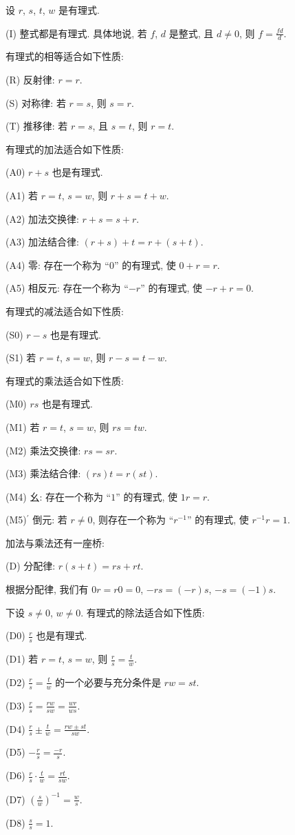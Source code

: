 \begin{proposition}
    设 $r$, $s$, $t$, $w$ 是有理式.

    (I) 整式都是有理式. 具体地说, 若 $f$, $d$ 是整式, 且 $d \neq 0$, 则 $f = \frac{fd}{d}$.

    有理式的相等适合如下性质:

    (R) 反射律: $r = r$.

    (S) 对称律: 若 $r = s$, 则 $s = r$.

    (T) 推移律: 若 $r = s$, 且 $s = t$, 则 $r = t$.

    有理式的加法适合如下性质:

    (A0) $r + s$ 也是有理式.

    (A1) 若 $r = t$, $s = w$, 则 $r + s = t + w$.

    (A2) 加法交换律: $r + s = s + r$.

    (A3) 加法结合律: $(r + s) + t = r + (s + t)$.

    (A4) 零: 存在一个称为 ``$0$'' 的有理式, 使 $0 + r = r$.

    (A5) 相反元: 存在一个称为 ``$-r$'' 的有理式, 使 $-r + r = 0$.

    有理式的减法适合如下性质:

    (S0) $r - s$ 也是有理式.

    (S1) 若 $r = t$, $s = w$, 则 $r - s = t - w$.

    有理式的乘法适合如下性质:

    (M0) $rs$ 也是有理式.

    (M1) 若 $r = t$, $s = w$, 则 $rs = tw$.

    (M2) 乘法交换律: $rs = sr$.

    (M3) 乘法结合律: $(rs)t = r(st)$.

    (M4) 幺: 存在一个称为 ``$1$'' 的有理式, 使 $1r = r$.

    (M5)$^{\prime}$ 倒元: 若 $r \neq 0$, 则存在一个称为 ``$r^{-1}$'' 的有理式, 使 $r^{-1} r = 1$.

    加法与乘法还有一座桥:

    (D) 分配律: $r (s + t) = rs + rt$.

    根据分配律, 我们有 $0r = r0 = 0$, $-rs = (-r)s$, $-s = (-1)s$.

    下设 $s \neq 0$, $w \neq 0$. 有理式的除法适合如下性质:

    (D0) $\frac{r}{s}$ 也是有理式.

    (D1) 若 $r = t$, $s = w$, 则 $\frac{r}{s} = \frac{t}{w}$.

    (D2) $\frac{r}{s} = \frac{t}{w}$ 的一个必要与充分条件是 $rw = st$.

    (D3) $\frac{r}{s} = \frac{rw}{sw} = \frac{wr}{ws}$.

    (D4) $\frac{r}{s} \pm \frac{t}{w} = \frac{rw \pm st}{sw}$.

    (D5) $-\frac{r}{s} = \frac{-r}{s}$.

    (D6) $\frac{r}{s} \cdot \frac{t}{w} = \frac{rt}{sw}$.

    (D7) $\left( \frac{s}{w} \right)^{-1} = \frac{w}{s}$.

    (D8) $\frac{s}{s} = 1$.
\end{proposition}

